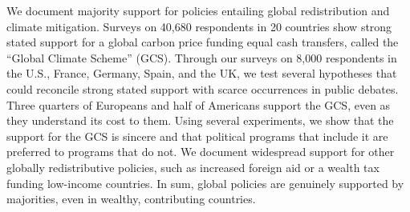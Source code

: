 We document majority support for policies entailing global redistribution and climate mitigation. Surveys on 40,680 respondents in 20 countries show strong stated support for a global carbon price funding equal cash transfers, called the ``Global Climate Scheme'' (GCS). Through our %
  surveys on 8,000 respondents in the U.S., France, Germany, Spain, and the UK, we test several hypotheses that could reconcile strong stated support with scarce occurrences in public debates. 
  Three quarters of Europeans and half of Americans support the GCS, even as they understand its cost to them. Using several experiments, we show that the support for the GCS is sincere and that political programs that include it are preferred to programs that do not. %
  We document widespread support for other globally redistributive policies, such as increased foreign aid or a wealth tax funding low-income countries. In sum, global policies are genuinely supported by majorities, even in wealthy, contributing countries. 